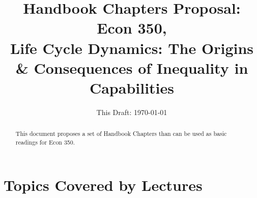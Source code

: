 \documentclass[12pt]{article}
\begin{document}
\title{\textbf{Handbook Chapters Proposal: Econ 350,\\ Life Cycle Dynamics: The Origins \& Consequences of Inequality in Capabilities}}
\date{This Draft: \today}
\maketitle

\begin{abstract}
\noindent This document proposes a set of Handbook Chapters than can be used as basic readings for Econ 350.
\end{abstract}

\section*{Topics Covered by Lectures}
\end{document}
